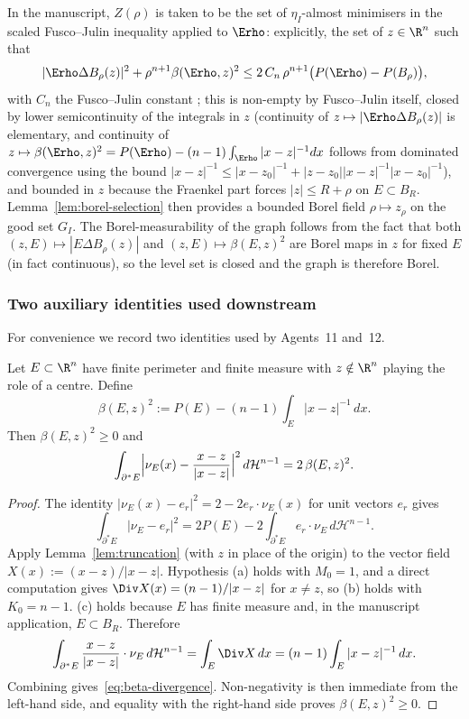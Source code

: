 \begin{remark}[Application]\label{rem:borel-application}
In the manuscript, $Z(\rho)$ is taken to be the set of
$\eta_I$-almost minimisers in the scaled Fusco--Julin inequality
applied to $\Erho$: explicitly, the set of $z\in\R^n$ such that
\[
   |\Erho\Delta B_\rho(z)|^2+\rho^{n+1}\beta(\Erho,z)^2
   \le 2\,C_n\,\rho^{n+1}\bigl(P(\Erho)-P(B_\rho)\bigr),
\]
with $C_n$ the Fusco--Julin constant
\cite[Thm.~1.1]{FJ2014}; this is non-empty by Fusco--Julin
itself, closed by lower semicontinuity of the integrals in $z$
(continuity of $z\mapsto|\Erho\Delta B_\rho(z)|$ is elementary, and
continuity of $z\mapsto\beta(\Erho,z)^2=P(\Erho)-(n-1)\int_{\Erho}
|x-z|^{-1}dx$ follows from dominated convergence using the bound
$|x-z|^{-1}\le|x-z_0|^{-1}+|z-z_0||x-z|^{-1}|x-z_0|^{-1}$), and
bounded in $z$ because the Fraenkel part forces $|z|\le R+\rho$ on
$E\subset B_R$.  Lemma~\ref{lem:borel-selection} then provides a
bounded Borel field $\rho\mapsto z_\rho$ on the good set $G_I$.
The Borel-measurability of the graph follows from the fact that
both $(z,E)\mapsto|E\Delta B_\rho(z)|$ and $(z,E)\mapsto
\beta(E,z)^2$ are Borel maps in $z$ for fixed $E$ (in fact
continuous), so the level set is closed and the graph is therefore
Borel.
\end{remark}

\subsubsection{Two auxiliary identities used downstream}
\label{ssec:aux-identities}

For convenience we record two identities used by Agents~11 and~12.

\begin{lemma}
\label{lem:beta-divergence}
Let $E\subset\R^n$ have finite perimeter and finite measure with
$z\notin\R^n$ playing the role of a centre.  Define
\[
   \beta(E,z)^2:=P(E)-(n-1)\int_E|x-z|^{-1}\,dx.
\]
Then $\beta(E,z)^2\ge 0$ and
\begin{equation}\label{eq:beta-divergence}
   \int_{\partial^*E}
      \Bigl|\nu_E(x)-\frac{x-z}{|x-z|}\Bigr|^2\,d\mathcal H^{n-1}
   =2\,\beta(E,z)^2.
\end{equation}
\end{lemma}

\begin{proof}
The identity $|\nu_E(x)-e_r|^2=2-2e_r\cdot\nu_E(x)$ for unit vectors
$e_r$ gives
\[
   \int_{\partial^*E}|\nu_E-e_r|^2
   =2P(E)-2\int_{\partial^*E}e_r\cdot\nu_E\,d\mathcal H^{n-1}.
\]
Apply Lemma~\ref{lem:truncation} (with $z$ in place of the origin) to
the vector field $X(x):=(x-z)/|x-z|$.  Hypothesis (a) holds with
$M_0=1$, and a direct computation gives $\Div X(x)=(n-1)/|x-z|$ for
$x\ne z$, so (b) holds with $K_0=n-1$.  (c) holds because $E$ has
finite measure and, in the manuscript application, $E\subset B_R$.
Therefore
\[
   \int_{\partial^*E}\frac{x-z}{|x-z|}\cdot\nu_E\,d\mathcal H^{n-1}
   =\int_E\Div X\,dx
   =(n-1)\int_E|x-z|^{-1}\,dx.
\]
Combining gives~\eqref{eq:beta-divergence}.  Non-negativity is then
immediate from the left-hand side, and equality with the right-hand
side proves $\beta(E,z)^2\ge0$.
\end{proof}

